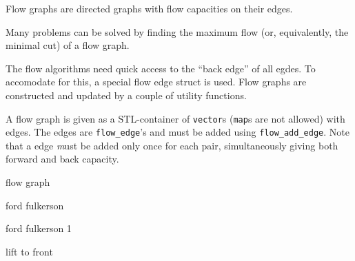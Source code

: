 
Flow graphs are directed graphs with flow capacities on their edges.

Many problems can be solved by finding the maximum flow (or, equivalently,
the minimal cut) of a flow graph.

The flow algorithms need quick access to the ``back edge'' of all egdes.
To accomodate for this, a special flow edge struct is used.
Flow graphs are constructed and updated by a couple of utility functions.

A flow graph is given as a STL-container of {\tt vector}s ({\tt map}s are
not allowed) with edges. The edges are {\tt flow\_edge}'s and must be added
using {\tt flow\_add\_edge}. Note that a edge {\emph must be} added only once
for each pair, simultaneously giving both forward and back capacity.


\begin{algorithm}{flow graph}
\end{algorithm}

\begin{algorithm}{ford fulkerson}

\end{algorithm}

\begin{algorithm}{ford fulkerson 1}

\end{algorithm}

\begin{algorithm}{lift to front}
\end{algorithm}
